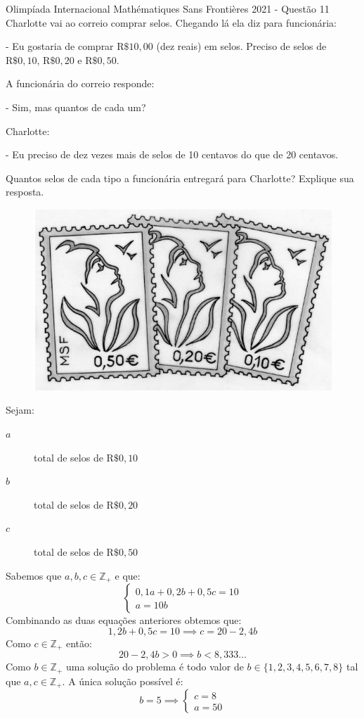 \documentclass[10pt,aspectratio=169]{beamer}
\begin{document}
\begin{frame}[t]
	\begin{exercicio}{Olimpíada Internacional Mathématiques Sans Frontières 2021 - Questão 11}
		Charlotte vai ao correio comprar selos.
		Chegando lá ela diz para funcionária:
		
		- Eu gostaria de comprar $\mathrm{R}\$ 10,00$ (dez reais) em selos. Preciso de selos de $\mathrm{R}\$ 0,10$, $\mathrm{R}\$ 0,20$ e $\mathrm{R}\$ 0,50$.
		
		A funcionária do correio responde:
		
		- Sim, mas quantos de cada um?
		
		Charlotte:
		
		- Eu preciso de dez vezes mais de selos de 10 centavos do que de 20 centavos.
		
		Quantos selos de cada tipo a funcionária entregará para Charlotte?
		Explique sua resposta.
	\end{exercicio}
	\begin{figure}
		\centering
		\includegraphics[width=0.4\linewidth]{figuras/MSFQ11}
	\end{figure}
\end{frame}

\begin{frame}[t]
	Sejam:
	\begin{description}
		\item[$ a $] total de selos de $\mathrm{R}\$ 0,10$
		\item[$ b $] total de selos de $\mathrm{R}\$ 0,20$
		\item[$ c $] total de selos de $\mathrm{R}\$ 0,50$
	\end{description}
	Sabemos que $ a,b,c\in\mathbb{Z}_+ $ e que:
	\begin{equation*}
		\begin{cases}
		0,1a+0,2b+0,5c=10\\
		a = 10b
		\end{cases}
	\end{equation*}
	Combinando as duas equações anteriores obtemos que:
	\begin{equation*}
		1,2b+0,5c=10 \implies c = 20-2,4b
	\end{equation*}
	Como $c\in\mathbb{Z}_+$ então:
	\begin{equation*}
		20-2,4b>0\implies b<8,333\ldots
	\end{equation*}
	Como $ b\in\mathbb{Z}_+ $ uma solução do problema é todo valor de $ b\in\{1,2,3,4,5,6,7,8\} $ tal que $a,c\in\mathbb{Z}_+$.
	A única solução possível é:
	\begin{equation*}
		b=5\implies
		\begin{cases}
		c = 8\\
		a = 50
		\end{cases}
	\end{equation*}
\end{frame}
\end{document}
